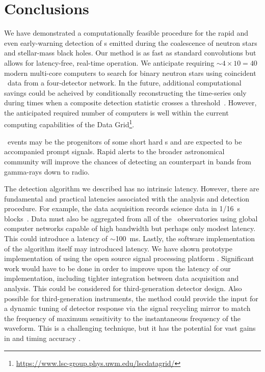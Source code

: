 \section{Conclusions}
\label{sec:conclusions}

We have demonstrated a computationally feasible procedure for the rapid and
even early-warning detection of \GW{}s emitted during the coalescence of
neutron stars and stellar-mass black holes. Our method is as fast as standard
\fft{} convolutions but allows for latency-free, real-time operation.  We
anticipate requiring $\sim 4 \times 10 = 40$ modern multi-core computers to
search for binary neutron stars using coincident \GW\ data from a four-detector
network.  In the future, additional computational savings could be acheived by
conditionally reconstructing the \SNR{} time-series only during times when a
composite detection statistic crosses a threshold~\citep{svd-compdetstat}.
However, the anticipated required number of computers is well within the
current computing capabilities of the \LIGO{} Data
Grid\footnote{\url{https://www.lsc-group.phys.uwm.edu/lscdatagrid/}}.

\CBC\ events may be the progenitors of some short hard \GRB{}s and are expected
to be accompanied prompt \EM{} signals.  Rapid alerts to the broader
astronomical community will improve the chances of detecting an \EM{}
counterpart in bands from gamma-rays down to radio.

The detection algorithm we described has no intrinsic latency.  However, there
are fundamental and practical latencies associated with the analysis and
detection procedure. For example, the \LIGO{} data acquisition records science
data in 1/16~s blocks~\citep{Bork2001}. Data must also be aggregated from all
of the \GW\ observatories using global computer networks capable of high
bandwidth but perhaps only modest latency.  This could introduce a latency of
$\sim$100~ms.  Lastly, the software implementation of the algorithm itself may
introduced latency.  We have shown prototype implementation of \lloid{} using
the open source signal processing platform \gstreamer. Significant work would
have to be done in order to improve upon the latency of our implementation,
including tighter integration between data acquisition and analysis. This could
be considered for third-generation detector design.  Also possible for
third-generation instruments, the \lloid{} method could provide the input for a
dynamic tuning of detector response via the signal recycling mirror to match
the frequency of maximum sensitivity to the instantaneous frequency of the
\GW{} waveform.  This is a challenging technique, but it has the potential for
vast gains in \SNR{} and timing accuracy \citep{PhysRevD.47.2184}.

